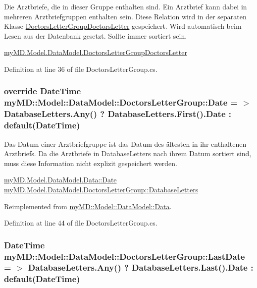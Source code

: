 Die Arztbriefe, die in dieser Gruppe enthalten sind. Ein Arztbrief kann dabei in mehreren Arztbriefgruppen enthalten sein. Diese Relation wird in der separaten Klasse \hyperlink{classmy_m_d_1_1_model_1_1_data_model_1_1_doctors_letter_group_doctors_letter}{Doctors\-Letter\-Group\-Doctors\-Letter} gespeichert. Wird automatisch beim Lesen aus der Datenbank gesetzt. Sollte immer sortiert sein. 

\hyperlink{classmy_m_d_1_1_model_1_1_data_model_1_1_doctors_letter_group_doctors_letter}{my\-MD.Model.Data\-Model.Doctors\-Letter\-Group\-Doctors\-Letter} 

Definition at line 36 of file Doctors\-Letter\-Group.cs.\hypertarget{classmy_m_d_1_1_model_1_1_data_model_1_1_doctors_letter_group_44749712dbec183e983dcd78a7736c41}{
\subsubsection[Date]{\setlength{\rightskip}{0pt plus 5cm}override Date\-Time my\-MD::Model::Data\-Model::Doctors\-Letter\-Group::Date = $>$ Database\-Letters.Any() ? Database\-Letters.First().Date : default(Date\-Time)}}
\label{db/dfe/classmy_m_d_1_1_model_1_1_data_model_1_1_doctors_letter_group_44749712dbec183e983dcd78a7736c41}


Das Datum einer Arztbriefgruppe ist das Datum des \"{a}ltesten in ihr enthaltenen Arztbriefs. Da die Arztbriefe in Database\-Letters nach ihrem Datum sortiert sind, muss diese Information nicht explizit gespeichert werden. 

\hyperlink{classmy_m_d_1_1_model_1_1_data_model_1_1_data_44749712dbec183e983dcd78a7736c41}{my\-MD.Model.Data\-Model.Data::Date} \hyperlink{classmy_m_d_1_1_model_1_1_data_model_1_1_doctors_letter_group_df84ceb32ca80cc7fb3907b660899e4b}{my\-MD.Model.Data\-Model.Doctors\-Letter\-Group::Database\-Letters} 

Reimplemented from \hyperlink{classmy_m_d_1_1_model_1_1_data_model_1_1_data_44749712dbec183e983dcd78a7736c41}{my\-MD::Model::Data\-Model::Data}.

Definition at line 44 of file Doctors\-Letter\-Group.cs.\hypertarget{classmy_m_d_1_1_model_1_1_data_model_1_1_doctors_letter_group_60f35d38f828e2c77f5243ebabc0e64b}{
\subsubsection[LastDate]{\setlength{\rightskip}{0pt plus 5cm}Date\-Time my\-MD::Model::Data\-Model::Doctors\-Letter\-Group::Last\-Date = $>$ Database\-Letters.Any() ? Database\-Letters.Last().Date : default(Date\-Time)}}
\label{db/dfe/classmy_m_d_1_1_model_1_1_data_model_1_1_doctors_letter_group_60f35d38f828e2c77f5243ebabc0e64b}


